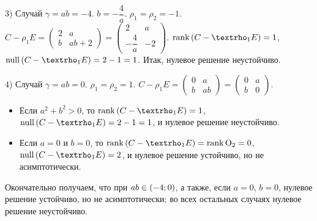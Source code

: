 \documentclass[a5paper,10pt]{article}
\begin{document}
3) Случай $\gamma = ab = -4$. $b = -\dfrac {4} {a}$. $\rho_{1} = \rho_{2} = -1$. 
$C - \rho_{1} E 
= \begin{pmatrix} 2 & a \\ b & ab + 2 \end{pmatrix} 
= \begin{pmatrix} 2 & a \\ -\dfrac {4} {a} & -2 \end{pmatrix} $. 
$\rank\br{C - \rho_{1} E} = 1$, $\nullity\br{C - \rho_{1} E} = 2 - 1 = 1$. Итак, нулевое решение неустойчиво.

4) Случай $\gamma = ab = 0$. $\rho_{1} = \rho_{2} = 1$. $C -\rho_{1} E = \begin{pmatrix} 0 & a \\ b & ab \end{pmatrix} = \begin{pmatrix} 0 & a \\ b & 0 \end{pmatrix}$.
\begin{itemize}
    \item Если $a^2 + b^2 > 0$, то $\rank\br{C -\rho_{1} E} = 1$, $\nullity\br{C -\rho_{1} E} = 2 - 1 = 1$, и нулевое решение неустойчиво.
    \item Если $a = 0$ и $b = 0$, то $\rank\br{C -\rho_{1} E} = \rank \Omicron_{2} = 0$, $\nullity\br{C -\rho_{1} E} = 2$, и нулевое решение устойчиво, но не асимптотически.
\end{itemize}

Окончательно получаем, что при $ab \in \left(-4; 0\right)$, а также, если $a = 0$, $b = 0$, нулевое решение устойчиво, но не асимптотически; во всех остальных случаях нулевое решение неустойчиво.
\end{document}
